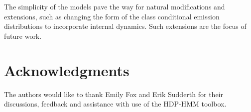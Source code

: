 \documentclass[letterpaper]{article}
\begin{document}
 The simplicity of the models pave the way for natural modifications and extensions, such as changing the form of the class conditional emission distributions to incorporate internal dynamics. Such extensions are the focus of future work.

\section{Acknowledgments}

The authors would like to thank Emily Fox and Erik Sudderth for their discussions, feedback and assistance with use of the HDP-HMM toolbox.



\end{document}
